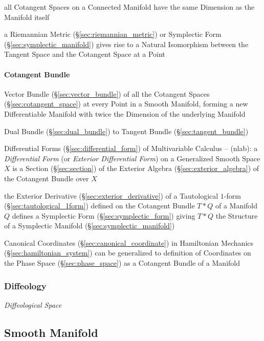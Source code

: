 all Cotangent Spaces on a Connected Manifold have the same Dimension as the
Manifold itself

a Riemannian Metric (\S\ref{sec:riemannian_metric}) or Symplectic Form
(\S\ref{sec:symplectic_manifold}) gives rise to a Natural Isomorphism between
the Tangent Space and the Cotangent Space at a Point



\paragraph{Cotangent Bundle}\label{sec:cotangent_bundle}\hfill

Vector Bundle (\S\ref{sec:vector_bundle}) of all the Cotangent Spaces
(\S\ref{sec:cotangent_space}) at every Point in a Smooth Manifold, forming a
new Differentiable Manifold with twice the Dimension of the underlying Manifold

Dual Bundle (\S\ref{sec:dual_bundle}) to Tangent Bundle
(\S\ref{sec:tangent_bundle})

\fist Differential Forms (\S\ref{sec:differential_form}) of Multivariable
Calculus -- (nlab): a \emph{Differential Form} (or \emph{Exterior Differential
  Form}) on a Generalized Smooth Space $X$ is a Section (\S\ref{sec:section}) of
the Exterior Algebra (\S\ref{sec:exterior_algebra}) of the Cotangent Bundle over
$X$

the Exterior Derivative (\S\ref{sec:exterior_derivative}) of a Tautological
$1$-form (\S\ref{sec:tautological_1form}) defined on the Cotangent Bundle $T *
Q$ of a Manifold $Q$ defines a Symplectic Form (\S\ref{sec:symplectic_form})
giving $T * Q$ the Structure of a Symplectic Manifold
(\S\ref{sec:symplectic_manifold})

Canonical Coordinates (\S\ref{sec:canonical_coordinate}) in Hamiltonian
Mechanics (\S\ref{sec:hamiltonian_system}) can be generalized to definition of
Coordinates on the Phase Space (\S\ref{sec:phase_space}) as a Cotangent Bundle
of a Manifold



\subsubsection{Diffeology}\label{sec:diffeology}

\emph{Diffeological Space}



\subsection{Smooth Manifold}\label{sec:smooth_manifold}

